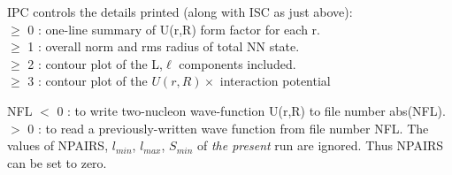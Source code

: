 \documentclass[11pt]{article}
\begin{document}
IPC controls the details printed (along with ISC as just above):\\
      $\geq$ 0 : one-line summary of U(r,R) form factor for each r.
\\  $\geq$ 1 : overall norm and rms radius of total NN state.
\\  $\geq$ 2 : contour plot of the L,$\ell$ components included.
\\  $\geq$ 3 : contour plot of the $U(r,R) \times$ interaction potential



NFL
      $<$ 0    : to write two-nucleon wave-function U(r,R) to file
number abs(NFL).
\\  $>$ 0 : to read a previously-written wave function from file number
NFL.  The values of NPAIRS, $l_{min}$, $l_{max}$, $S_{min}$ of
{\em the present}
run are ignored.  Thus NPAIRS can be set to zero.
\end{document}
